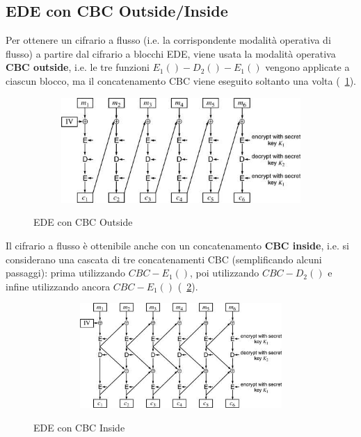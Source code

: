 \subsection{EDE con CBC Outside/Inside}
Per ottenere un cifrario a flusso (i.e. la corrispondente modalità operativa di flusso) a partire dal cifrario a blocchi EDE, viene usata la modalità operativa \textbf{CBC outside}, i.e. le tre funzioni $E_{1}()-D_{2}()-E_{1}()$ vengono applicate a ciascun blocco, ma il concatenamento CBC viene eseguito soltanto una volta (\figurename ~\ref{fig:EDE_CBC_Out}).\\ 
\begin{figure}[htbp]
	\centering%
	\subfigure%
	{\includegraphics[height=4cm, width=12cm, keepaspectratio]{Immagini/Capitolo3/EDE_CBC_Out.png}}
	\caption{EDE con CBC Outside \label{fig:EDE_CBC_Out}} 	
\end{figure}
Il cifrario a flusso è ottenibile anche con un concatenamento \textbf{CBC inside}, i.e. si considerano una cascata di tre concatenamenti CBC (semplificando alcuni passaggi): prima utilizzando $CBC-E_{1}()$, poi utilizzando $CBC-D_{2}()$ e infine utilizzando ancora $CBC-E_{1}()$ (\figurename ~\ref{fig:EDE_CBC_In}).
\begin{figure}[htbp]
	\centering%
	\subfigure%
	{\includegraphics[height=4cm, width=12cm, keepaspectratio]{Immagini/Capitolo3/EDE_CBC_In.png}}
	\caption{EDE con CBC Inside \label{fig:EDE_CBC_In}} 	
\end{figure}
